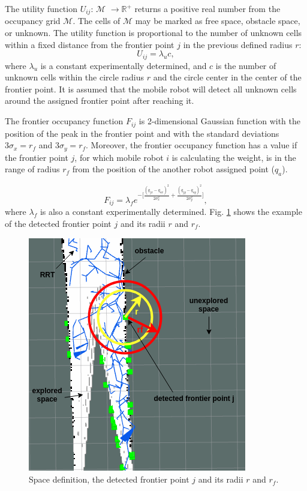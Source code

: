 \documentclass[letterpaper, 10 pt, conference]{ieeeconf}  %
\begin{document}
The utility function $U_{ij}$:  \(\text{$\mathcal {M}$}\) \(\rightarrow \text{$\mathbb{R}^{+}$}\) returns a positive real number from the occupancy grid \(\text{$\mathcal {M}$}\). The cells of \(\text{$\mathcal {M}$}\) may be marked as free space, obstacle space, or unknown. The utility function is proportional to the number of unknown cells within a fixed distance from the frontier point $j$ in the previous defined radius $r$: 
\begin{equation}
    U_{ij} = \lambda_{u}c,
\end{equation}
where $\lambda_{u}$ is a constant experimentally determined, and  $c$ is the number of unknown cells within the circle radius $r$ and the circle center in the center of the frontier point. It is assumed that the mobile robot will detect all unknown cells around the assigned frontier point after reaching it. 

The frontier occupancy function $F_{ij}$ is 2-dimensional Gaussian function with the position of the peak in the frontier point and with the standard deviations $3\sigma_{x}=r_{f}$ and $3\sigma_{y}=r_{f}$. Moreover, the frontier occupancy function has a value if the frontier point $j$, for which mobile robot $i$ is calculating the weight, is in the range of radius $r_{f}$ from the position of the another robot assigned point ($q_{a}$). 

\begin{equation}
    F_{ij} =  \lambda_{f} e^{-\Big[\frac{(q_{jx} - q_{ax})^2}{2\sigma_{x}^2} + \frac{(q_{jy} - q_{ay})^2}{2\sigma_{y}^2}\Big]},
\end{equation}
where $\lambda_{f}$  is also  a constant experimentally determined. Fig. \ref{fig:radijusi} shows the example of the detected frontier point $j$ and its radii $r$ and $r_{f}$.

\begin{figure}[h!]
	\centering\includegraphics[width=0.8\columnwidth]{radius-and-space.png}
	\caption{Space definition, the detected frontier point $j$ and its radii $r$ and $r_{f}$.}
	\label{fig:radijusi}
\end{figure}
\end{document}
